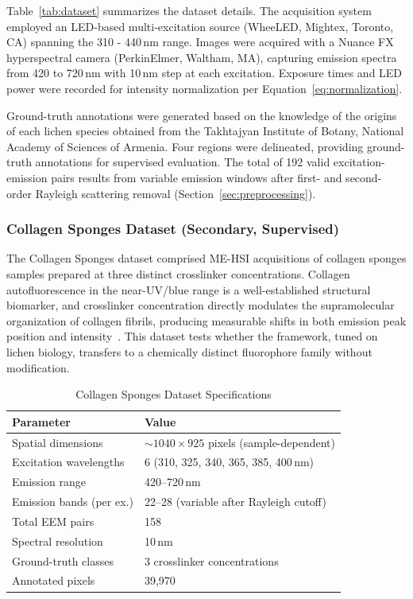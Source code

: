 Table~\ref{tab:dataset} summarizes the dataset details.
The acquisition system employed an LED-based multi-excitation source (WheeLED, Mightex, Toronto, CA) spanning the 310 - 440\,nm range. Images were acquired with a Nuance FX hyperspectral camera (PerkinElmer, Waltham, MA), capturing emission spectra from 420 to 720\,nm with 10\,nm step at each excitation.
Exposure times and LED power were recorded for intensity normalization per Equation~\eqref{eq:normalization}.

Ground-truth annotations were generated based on the knowledge of the origins of each lichen species obtained from the Takhtajyan Institute of Botany, National Academy of Sciences of Armenia.
Four regions were delineated, providing ground-truth annotations for supervised evaluation.
The total of 192 valid excitation-emission pairs results from variable emission windows after first- and second-order Rayleigh scattering removal (Section~\ref{sec:preprocessing}).

\subsubsection{Collagen Sponges Dataset (Secondary, Supervised)}
\label{sec:dataset_pepsin}

The Collagen Sponges dataset comprised ME-HSI acquisitions of collagen sponges samples prepared at three distinct crosslinker concentrations.
Collagen autofluorescence in the near-UV/blue range is a well-established structural biomarker, and crosslinker concentration directly modulates the supramolecular organization of collagen fibrils, producing measurable shifts in both emission peak position and intensity~\cite{lakowicz2006principles,meysurova2021optical}.
This dataset tests whether the framework, tuned on lichen biology, transfers to a chemically distinct fluorophore family without modification.

\begin{table}[!t]
\centering
\caption{Collagen Sponges Dataset Specifications}
\label{tab:dataset_pepsin}
\begin{tabular}{@{}ll@{}}
\toprule
\textbf{Parameter} & \textbf{Value} \\
\midrule
Spatial dimensions & $\sim$$1040 \times 925$ pixels (sample-dependent) \\
Excitation wavelengths & 6 (310, 325, 340, 365, 385, 400\,nm) \\
Emission range & 420--720\,nm \\
Emission bands (per ex.) & 22--28 (variable after Rayleigh cutoff) \\
Total EEM pairs & 158 \\
Spectral resolution & 10\,nm \\
Ground-truth classes & 3 crosslinker concentrations \\
Annotated pixels & 39,970 \\
\bottomrule
\end{tabular}
\end{table}

